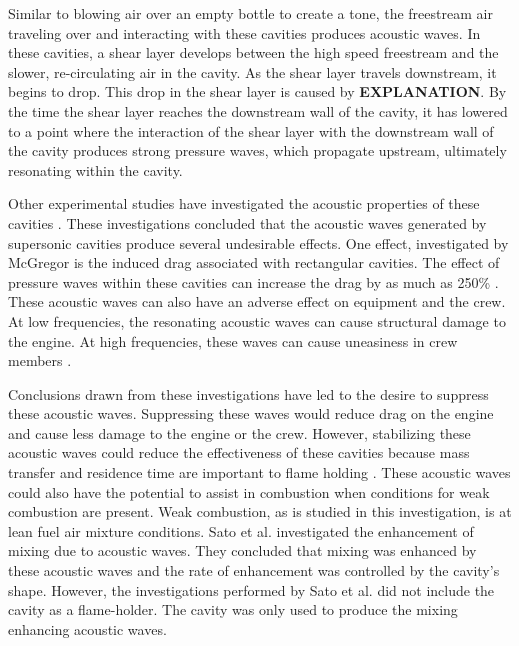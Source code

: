 Similar to blowing air over an empty bottle to create a tone, the freestream air traveling over and interacting with these cavities produces acoustic waves. In these cavities, a shear layer develops between the high speed freestream and the slower, re-circulating air in the cavity. As the shear layer travels downstream, it begins to drop. This drop in the shear layer is caused by \textbf{EXPLANATION}. By the time the shear layer reaches the downstream wall of the cavity, it has lowered to a point where the interaction of the shear layer with the downstream wall of the cavity produces strong pressure waves, which propagate upstream, ultimately resonating within the cavity. 

Other experimental studies have investigated the acoustic properties of these cavities \cite{unalmis2004cavity,heller1996letter,williams2007supersonic, mcgregor1970drag,luo2011drag, sato1999advanced}. These investigations concluded that the acoustic waves generated by supersonic cavities produce several undesirable effects. One effect, investigated by McGregor is the induced drag associated with rectangular cavities. The effect of pressure waves within these cavities can increase the drag by as much as 250\% \cite{mcgregor1970drag}. These acoustic waves can also have an adverse effect on equipment and the crew. At low frequencies, the resonating acoustic waves can cause structural damage to the engine. At high frequencies, these waves can cause uneasiness in crew members \cite{mcgregor1970drag}.

Conclusions drawn from these investigations have led to the desire to suppress these acoustic waves. Suppressing these waves would reduce drag on the engine and cause less damage to the engine or the crew. However, stabilizing these acoustic waves could reduce the effectiveness of these cavities because mass transfer and residence time are important to flame holding \cite{ben2001cavity}. These acoustic waves could also have the potential to assist in combustion when conditions for weak combustion are present. Weak combustion, as is studied in this investigation, is at lean fuel air mixture conditions. Sato et al.\cite{sato1999advanced} investigated the enhancement of mixing due to acoustic waves. They concluded that mixing was enhanced by these acoustic waves and the rate of enhancement was controlled by the cavity's shape. However, the investigations performed by Sato et al. did not include the cavity as a flame-holder. The cavity was only used to produce the mixing enhancing acoustic waves. 

